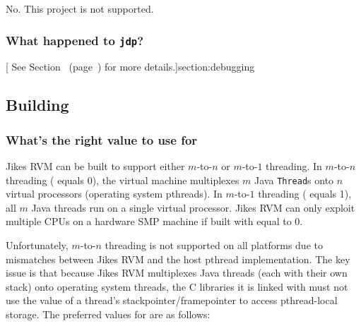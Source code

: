 No. This project is not supported. 

\subsubsection{What happened to {\tt jdp}?}

[ See
Section~\Ref{} (page~\Pageref) for more details.]{section:debugging}

\subsection{Building \jrvm}


\subsubsection{What's the right value to use for
 }%
\label{singleProcessorQuestion}%
%
%
%


Jikes RVM can be built to support either $m$-to-$n$ or $m$-to-$1$
threading.  In $m$-to-$n$ threading
( equals 0), the virtual machine
multiplexes $m$ Java {\tt Thread}s
onto $n$ virtual processors (operating system pthreads).
In $m$-to-$1$ threading ( equals 1),
all $m$ Java threads run on a single virtual processor.  Jikes RVM 
can only exploit multiple CPUs on a hardware SMP machine if 
built with  equal to 0.

Unfortunately, $m$-to-$n$ threading is not supported on all platforms due to
mismatches between Jikes RVM  and the host pthread implementation.  
The key issue is that because Jikes RVM multiplexes Java threads
(each with their own stack) onto operating system threads, the
C libraries it is linked with must not use the value of a thread's
stackpointer/framepointer to access pthread-local storage.  The
preferred values for  are as
follows: 

